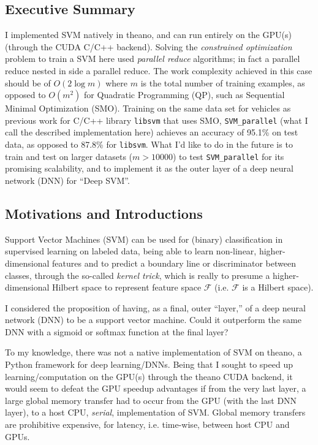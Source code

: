 \documentclass[10pt]{amsart}
\begin{document}
\begin{multicols*}{2}
\subsection{Executive Summary}

I implemented SVM natively in theano, and can run entirely on the GPU(s) (through the CUDA C/C++ backend).  Solving the \emph{constrained optimization} problem to train a SVM here used \emph{parallel reduce} algorithms; in fact a parallel reduce nested in side a parallel reduce.  The work complexity achieved in this case should be of $O(2\log{m})$ where $m$ is the total number of training examples, as opposed to $O(m^2)$ for Quadratic Programming (QP), such as Sequential Minimal Optimization (SMO).  Training on the same data set for vehicles as previous work for C/C++ library \verb|libsvm| that uses SMO, \verb|SVM_parallel| (what I call the described implementation here) achieves an accuracy of 95.1\% on test data, as opposed to 87.8\% for \verb|libsvm|.  What I'd like to do in the future is to train and test on larger datasets ($m>10000$) to test \verb|SVM_parallel| for its promising scalability, and to implement it as the outer layer of a deep neural network (DNN) for ``Deep SVM''.  

\subsection{Motivations and Introductions}\label{Sec:MotivationsIntroductions}

Support Vector Machines (SVM) can be used for (binary) classification in supervised learning on labeled data, being able to learn non-linear, higher-dimensional features and to predict a boundary line or discriminator between classes, through the so-called \emph{kernel trick}, which is really to presume a higher-dimensional Hilbert space to represent feature space $\mathcal{F}$ (i.e. $\mathcal{F}$ is a Hilbert space).

I considered the proposition of having, as a final, outer ``layer,'' of a deep neural network (DNN) to be a support vector machine.  Could it outperform the same DNN with a sigmoid or softmax function at the final layer?

To my knowledge, there was not a native implementation of SVM on theano, a Python framework for deep learning/DNNs.  Being that I sought to speed up learning/computation on the GPU(s) through the theano CUDA backend, it would seem to defeat the GPU speedup advantages if from the very last layer, a large global memory transfer had to occur from the GPU (with the last DNN layer), to a host CPU, \emph{serial}, implementation of SVM.  Global memory transfers are prohibitive expensive, for latency, i.e. time-wise, between host CPU and GPUs.\cite{CS344}    


\end{multicols*}
\end{document}
